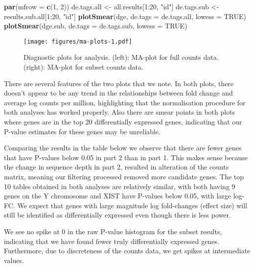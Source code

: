 \documentclass[]{article}
\newenvironment{Shaded}{\begin{snugshade}}{\end{snugshade}}
\newcommand{\KeywordTok}[1]{\textcolor[rgb]{0.13,0.29,0.53}{\textbf{{#1}}}}
\newcommand{\DataTypeTok}[1]{\textcolor[rgb]{0.13,0.29,0.53}{{#1}}}
\newcommand{\DecValTok}[1]{\textcolor[rgb]{0.00,0.00,0.81}{{#1}}}
\newcommand{\StringTok}[1]{\textcolor[rgb]{0.31,0.60,0.02}{{#1}}}
\newcommand{\OtherTok}[1]{\textcolor[rgb]{0.56,0.35,0.01}{{#1}}}
\newcommand{\NormalTok}[1]{{#1}}
\begin{document}
\begin{Shaded}
\begin{Highlighting}[]
\KeywordTok{par}\NormalTok{(}\DataTypeTok{mfrow =} \KeywordTok{c}\NormalTok{(}\DecValTok{1}\NormalTok{, }\DecValTok{2}\NormalTok{))}
\NormalTok{de.tags.all <-}\StringTok{ }\NormalTok{all.results[}\DecValTok{1}\NormalTok{:}\DecValTok{20}\NormalTok{, }\StringTok{"id"}\NormalTok{]}
\NormalTok{de.tags.sub <-}\StringTok{ }\NormalTok{results.sub.all[}\DecValTok{1}\NormalTok{:}\DecValTok{20}\NormalTok{, }\StringTok{"id"}\NormalTok{]}
\KeywordTok{plotSmear}\NormalTok{(dge, }\DataTypeTok{de.tags =} \NormalTok{de.tags.all, }\DataTypeTok{lowess =} \OtherTok{TRUE}\NormalTok{)}
\KeywordTok{plotSmear}\NormalTok{(dge.sub, }\DataTypeTok{de.tags =} \NormalTok{de.tags.sub, }\DataTypeTok{lowess =} \OtherTok{TRUE}\NormalTok{)}
\end{Highlighting}
\end{Shaded}

\begin{figure}[htbp]
\centering
\texttt{[image: figures/ma-plots-1.pdf]}
\caption{Diagnostic plots for analysis. (left): MA-plot for full counts
data. (right): MA-plot for subset counts data.}
\end{figure}

There are several features of the two plots that we note. In both plots,
there doesn't appear to be any trend in the relationships between fold
change and average log counts per million, highlighting that the
normalisation procedure for both analyses has worked properly. Also
there are smear points in both plots where genes are in the top 20
differentially expressed genes, indicating that our P-value estimates
for these genes may be unreliable.

Comparing the results in the table below we observe that there are fewer
genes that have P-values below 0.05 in part 2 than in part 1. This makes
sense because the change in sequence depth in part 2, resulted in
alteration of the counts matrix, meaning our filtering processed removed
more candidate genes. The top 10 tables obtained in both analyses are
relatively similar, with both having 9 genes on the Y chromosome and
XIST have P-values below 0.05, with large log-FC. We expect that genes
with large magnitude log fold-changes (effect size) will still be
identified as differentially expressed even though there is less power.

We see no spike at 0 in the raw P-value histogram for the subset
results, indicating that we have found fewer truly differentially
expressed genes. Furthermore, due to discreteness of the counts data, we
get spikes at intermediate values.
\end{document}
